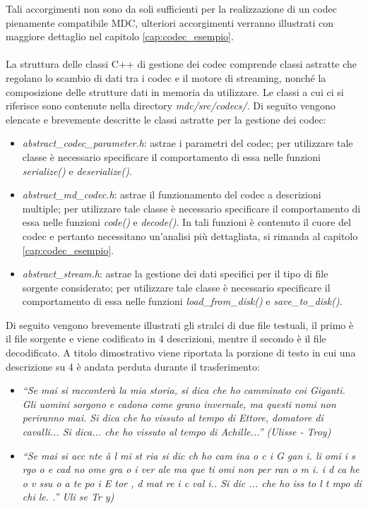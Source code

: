 Tali accorgimenti non sono da soli sufficienti per la realizzazione di un codec
pienamente compatibile MDC, ulteriori accorgimenti verranno illustrati con
maggiore dettaglio nel capitolo \ref{cap:codec_esempio}.
\\\\
La struttura delle classi C++ di gestione dei codec comprende classi astratte
che regolano lo scambio di dati tra i codec e il motore di streaming, nonché la
composizione delle strutture dati in memoria da utilizzare. Le classi a cui ci si riferisce sono contenute nella directory \textit{mdc/src/codecs/}. Di
seguito vengono elencate e brevemente descritte le classi astratte per la
gestione dei codec:
\begin{itemize}
 \item \textit{abstract\_codec\_parameter.h}: astrae i parametri del codec; per
 utilizzare tale classe è necessario specificare il comportamento di essa nelle
 funzioni \textit{serialize()} e \textit{deserialize()}.
 \item \textit{abstract\_md\_codec.h}: astrae il funzionamento del codec a
 descrizioni multiple; per utilizzare tale classe è necessario specificare il
 comportamento di essa nelle funzioni \textit{code()} e \textit{decode()}. In
 tali funzioni è contenuto il cuore del codec e pertanto necessitano un'analisi
 più dettagliata, si rimanda al capitolo \ref{cap:codec_esempio}.
 \item \textit{abstract\_stream.h}: astrae la gestione dei dati specifici per il
 tipo di file sorgente considerato; per utilizzare tale classe è necessario
 specificare il comportamento di essa nelle funzioni \textit{load\_from\_disk()}
 e \textit{save\_to\_disk()}.
\end{itemize}

Di seguito vengono brevemente illustrati gli stralci di due file
testuali, il primo è il file sorgente e viene codificato in 4 descrizioni,
mentre il secondo è il file decodificato. A titolo dimostrativo viene riportata
la porzione di testo in cui una descrizione su 4 è andata perduta durante il
trasferimento:

\begin{itemize}
  \item \emph{``Se mai si racconterà la mia storia, si dica che ho camminato
  coi Giganti. Gli uomini sorgono e cadono come grano invernale, ma questi nomi non periranno mai. Si dica che ho vissuto al tempo di Ettore, domatore di cavalli... Si dica... che ho vissuto al tempo di Achille...'' (Ulisse - Troy)}
  \item \emph{``Se mai si  acc nte à l  mi  st ria  si dic  ch  ho cam ina o c
  i G gan i.  li  omi i s rgo o e cad no  ome gra o i ver ale  ma que ti  omi  
  non per ran o m i.  i d ca  he  o v ssu o a  te po  i E tor , d mat re  i
  c val i..  Si dic ... che ho  iss to  l t mpo di  chi le. .''  Uli se   Tr y)}
\end{itemize}

